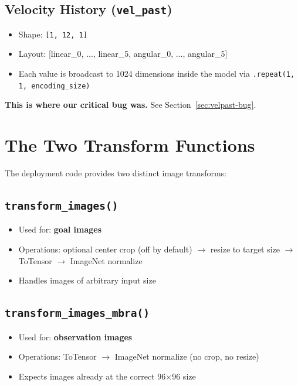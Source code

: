 \documentclass[11pt,a4paper]{article}
\begin{document}
\subsection{Velocity History (\texttt{vel\_past})}

\begin{itemize}[nosep]
  \item Shape: \texttt{[1, 12, 1]}
  \item Layout: [linear\_0, ..., linear\_5, angular\_0, ..., angular\_5]
  \item Each value is broadcast to 1024 dimensions inside the model via
    \texttt{.repeat(1, 1, encoding\_size)}
\end{itemize}

\textbf{This is where our critical bug was.}  See Section~\ref{sec:velpast-bug}.

\section{The Two Transform Functions}

The deployment code provides two distinct image transforms:

\subsection{\texttt{transform\_images()}}

\begin{itemize}[nosep]
  \item Used for: \textbf{goal images}
  \item Operations: optional center crop (off by default) $\to$ resize to
    target size $\to$ ToTensor $\to$ ImageNet normalize
  \item Handles images of arbitrary input size
\end{itemize}

\subsection{\texttt{transform\_images\_mbra()}}

\begin{itemize}[nosep]
  \item Used for: \textbf{observation images}
  \item Operations: ToTensor $\to$ ImageNet normalize (no crop, no resize)
  \item Expects images already at the correct 96$\times$96 size
\end{itemize}
\end{document}

